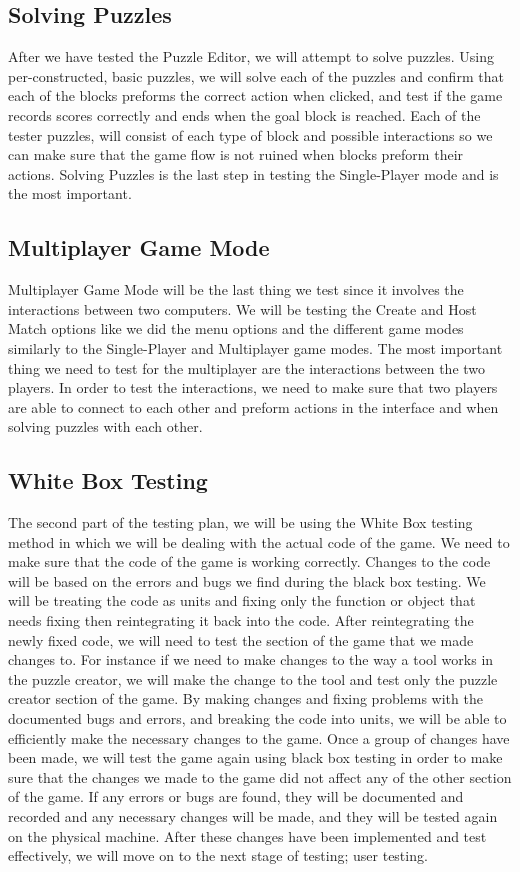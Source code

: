 \documentclass[12pt]{article}
\begin{document}
\subsection{Solving Puzzles}
After we have tested the Puzzle Editor, we will attempt to solve puzzles. Using per-constructed, basic puzzles, we will solve each of the puzzles and confirm that each of the blocks preforms the correct action when clicked, and test if the game records scores correctly and ends when the goal block is reached. Each of the tester puzzles, will consist of each type of block and possible interactions so we can make sure that the game flow is not ruined when blocks preform their actions. Solving Puzzles is the last step in testing the Single-Player mode and is the most important.

\subsection{Multiplayer Game Mode}
Multiplayer Game Mode will be the last thing we test since it involves the interactions between two computers. We will be testing the Create and Host Match options like we did the menu options and the different game modes similarly to the Single-Player and Multiplayer game modes. The most important thing we need to test for the multiplayer are the interactions between the two players. In order to test the interactions, we need to make sure that two players are able to connect to each other and preform actions in the interface and when solving puzzles with each other.

\subsection{White Box Testing}
The second part of the testing plan, we will be using the White Box testing method in which we will be dealing with the actual code of the game. We need to make sure that the code of the game is working correctly.
Changes to the code will be based on the errors and bugs we find during the black box testing. We will be treating the code as units and fixing only the function or object that needs fixing then reintegrating it back into the code. After reintegrating the newly fixed code, we will need to test the section of the game that we made changes to. For instance if we need to make changes to the way a tool works in the puzzle creator, we will make the change to the tool and test only the puzzle creator section of the game.
By making changes and fixing problems with the documented bugs and errors, and breaking the code into units, we will be able to efficiently make the necessary changes to the game. Once a group of changes have been made, we will test the game again using black box testing in order to make sure that the changes we made to the game did not affect any of the other section of the game. If any errors or bugs are found, they will be documented and recorded and any necessary changes will be made, and they will be tested again on the physical machine. After these changes have been implemented and test effectively, we will move on to the next stage of testing; user testing.
\end{document}
